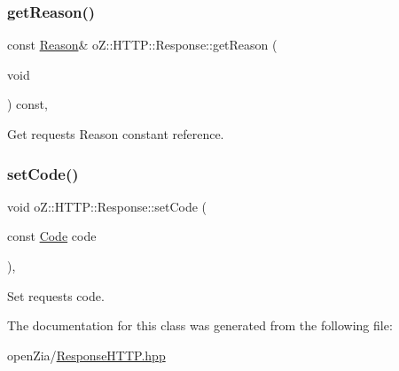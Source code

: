 \mbox{\label{classo_z_1_1_h_t_t_p_1_1_response_a9b05303e7b76a04d3ab4ed8960de130c}} 
\subsubsection{\texorpdfstring{getReason()}{getReason()}\hspace{0.1cm}{\footnotesize\ttfamily [2/2]}}
{\footnotesize\ttfamily const \mbox{\hyperlink{namespaceo_z_1_1_h_t_t_p_afcd8b91e5e8a7b6df0a7b3b298ec3965}{Reason}}\& o\+Z\+::\+H\+T\+T\+P\+::\+Response\+::get\+Reason (\begin{DoxyParamCaption}\item[{void}]{ }\end{DoxyParamCaption}) const\hspace{0.3cm}{\ttfamily [inline]}, {\ttfamily [noexcept]}}



Get request\textquotesingle{}s Reason constant reference. 

\mbox{\label{classo_z_1_1_h_t_t_p_1_1_response_a37a97a943ebded8fca87ee14cd76c0fa}} 
\subsubsection{\texorpdfstring{setCode()}{setCode()}}
{\footnotesize\ttfamily void o\+Z\+::\+H\+T\+T\+P\+::\+Response\+::set\+Code (\begin{DoxyParamCaption}\item[{const \mbox{\hyperlink{namespaceo_z_1_1_h_t_t_p_acd43703151305f79b1e2f42e98ee8199}{Code}}}]{code }\end{DoxyParamCaption})\hspace{0.3cm}{\ttfamily [inline]}, {\ttfamily [noexcept]}}



Set request\textquotesingle{}s code. 



The documentation for this class was generated from the following file\+:\begin{DoxyCompactItemize}
\item 
open\+Zia/\mbox{\hyperlink{_response_h_t_t_p_8hpp}{Response\+H\+T\+T\+P.\+hpp}}\end{DoxyCompactItemize}
